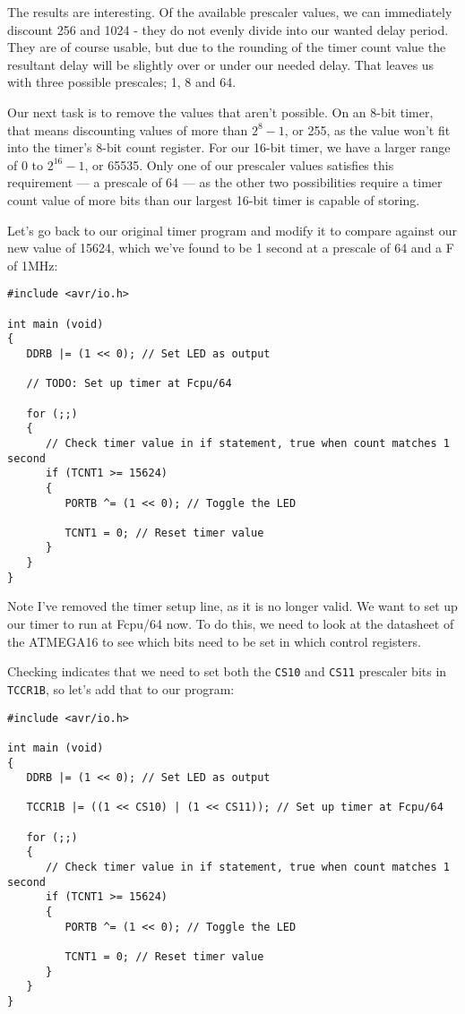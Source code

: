 \documentclass[a4paper,oneside,notitlepage]{book}
\begin{document}
The results are interesting. Of the available prescaler values, we can immediately discount 256 and 1024 - they do not evenly divide into our wanted delay period. They are of course usable, but due to the rounding of the timer count value the resultant delay will be slightly over or under our needed delay. That leaves us with three possible prescales; 1, 8 and 64.

Our next task is to remove the values that aren't possible. On an 8-bit timer, that means discounting values of more than \(2^{8} - 1\), or 255, as the value won't fit into the timer's 8-bit count register. For our 16-bit timer, we have a larger range of 0 to \(2^{16}-1\), or 65535. Only one of our prescaler values satisfies this requirement --- a prescale of 64 --- as the other two possibilities require a timer count value of more bits than our largest 16-bit timer is capable of storing.

Let's go back to our original timer program and modify it to compare against our new value of 15624, which we've found to be 1 second at a prescale of 64 and a F of 1MHz: 

\begin{center}
\begin{lstlisting}
#include <avr/io.h>

int main (void)
{
   DDRB |= (1 << 0); // Set LED as output

   // TODO: Set up timer at Fcpu/64

   for (;;)
   {
      // Check timer value in if statement, true when count matches 1 second
      if (TCNT1 >= 15624)
      {
         PORTB ^= (1 << 0); // Toggle the LED

         TCNT1 = 0; // Reset timer value
      }
   }
} 
\end{lstlisting}
\end{center}

Note I've removed the timer setup line, as it is no longer valid. We want to set up our timer to run at Fcpu/64 now. To do this, we need to look at the datasheet of the ATMEGA16 to see which bits need to be set in which control registers.

Checking indicates that we need to set both the \texttt{CS10} and \texttt{CS11} prescaler bits in \texttt{TCCR1B}, so let's add that to our program: 

\begin{center}
\begin{lstlisting}
#include <avr/io.h>

int main (void)
{
   DDRB |= (1 << 0); // Set LED as output

   TCCR1B |= ((1 << CS10) | (1 << CS11)); // Set up timer at Fcpu/64

   for (;;)
   {
      // Check timer value in if statement, true when count matches 1 second
      if (TCNT1 >= 15624)
      {
         PORTB ^= (1 << 0); // Toggle the LED

         TCNT1 = 0; // Reset timer value
      }
   }
}
\end{lstlisting}
\end{center}
\end{document}
